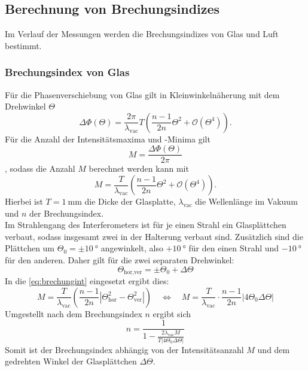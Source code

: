 \subsection{Berechnung von Brechungsindizes}
Im Verlauf der Messungen werden die Brechungsindizes von Glas und Luft bestimmt.
\subsubsection{Brechungsindex von Glas}
Für die Phasenverschiebung von Glas gilt in Kleinwinkelnäherung mit dem Drehwinkel $\Theta$
\begin{equation}
    \Delta\Phi\left(\Theta\right) = \frac{2\pi}{\lambda_{\text{vac}}}T\left(\frac{n - 1}{2n}\Theta^2 + \mathcal{O}\left(\Theta^4\right)\right).
    \label{eq:poli}
\end{equation}
Für die Anzahl der Intensitätsmaxima und -Minima gilt
\begin{equation}
    M = \frac{\Delta\Phi\left(\Theta\right)}{2\pi}
\end{equation}
, sodass die Anzahl $M$ berechnet werden kann mit
\begin{equation}
    M = \frac{T}{\lambda_{\text{vac}}}\left(\frac{n - 1}{2n}\Theta^2 + \mathcal{O}\left(\Theta^4\right)\right).
    \label{eq:brechungint}
\end{equation}
Hierbei ist $T = \SI{1}{\milli\metre}$ die Dicke der Glasplatte, $\lambda_{\text{vac}}$ die Wellenlänge im Vakuum und $n$ der Brechungsindex.\\
Im Strahlengang des Interferometers ist für je einen Strahl ein Glasplättchen verbaut, sodass insgesamt zwei in der Halterung verbaut sind.
Zusätzlich sind die Plättchen um $\Theta_0 = \pm \SI{10}{\degree}$ angewinkelt, also $+\SI{10}{\degree}$ für den einen Strahl und $-\SI{10}{\degree}$ für den anderen.
Daher gilt für die zwei separaten Drehwinkel:
\begin{equation}
    \Theta_{\text{hor,ver}} = \pm\Theta_0 + \Delta\Theta
\end{equation}
In die \autoref{eq:brechungint} eingesetzt ergibt dies:
\begin{equation}
    M = \frac{T}{\lambda_{\text{vac}}}\left(\frac{n - 1}{2n}|\Theta_{\text{hor}}^2 - \Theta_{\text{ver}}^2|\right) \quad \iff \quad M = \frac{T}{\lambda_{\text{vac}}}\cdot\frac{n - 1}{2n}|4\Theta_0 \Delta\Theta|
\end{equation}
Umgestellt nach dem Brechungsindex $n$ ergibt sich
\begin{equation}
    n = \frac{1}{1 - \frac{2\lambda_{\text{vac}}M}{T|4\Theta_0\Delta\Theta|}}
    \label{eq:brechungsindex}
\end{equation}
Somit ist der Brechungsindex abhängig von der Intensitätsanzahl $M$ und dem gedrehten Winkel der Glasplättchen $\Delta\Theta$.
